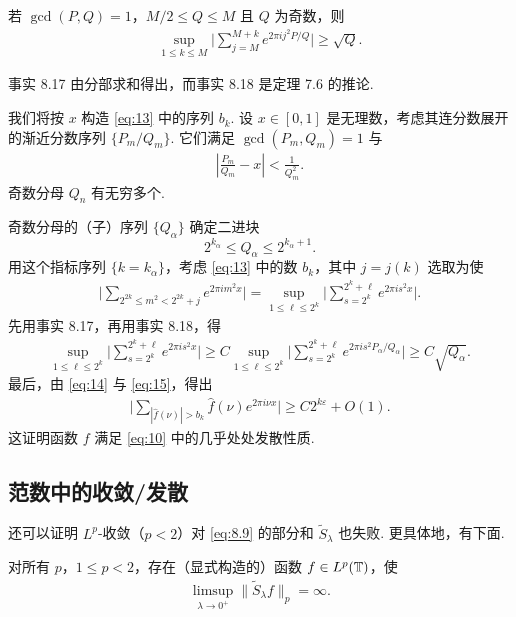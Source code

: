 \begin{fact}\label{fact:8.18}
若 $\gcd(P, Q) = 1$，$M/2 \leq Q \leq M$ 且 $Q$ 为奇数，则
\begin{align*}
  \sup_{1\leq k\leq M}\Big|\sum_{j=M}^{M+k}e^{2\pi i j^{2}P/Q}\Big|\geq\sqrt{Q}.
\end{align*}
\end{fact}

事实 8.17 由分部求和得出，而事实 8.18 是定理 7.6 的推论.

我们将按 $x$ 构造 \eqref{eq:13} 中的序列 $b_k$. 设 $x \in [0,1]$ 是无理数，考虑其连分数展开的渐近分数序列 $\{P_m/Q_m\}$. 它们满足 $\gcd(P_m, Q_m) = 1$ 与
\begin{align*}
  \left|\frac{P_{m}}{Q_{m}}-x\right|<\frac{1}{Q_{m}^{2}}.
\end{align*}
奇数分母 $Q_{n}$ 有无穷多个.

奇数分母的（子）序列 $\{Q_{\alpha}\}$ 确定二进块
\begin{equation}\label{eq:15}
  2^{k_{\alpha}}\leq Q_{\alpha}\leq 2^{k_{\alpha}+1}.
\end{equation}
用这个指标序列 $\{k = k_\alpha\}$，考虑 \eqref{eq:13} 中的数 $b_k$，其中 $j = j(k)$ 选取为使
\begin{align*}
  \Big|\sum_{2^{2k}\leq m^{2}<2^{2k}+j}e^{2\pi i m^{2}x}\Big|
  =\sup_{1\leq\ell\leq 2^{k}}\Big|\sum_{s=2^{k}}^{2^{k}+\ell}e^{2\pi i s^{2}x}\Big|.
\end{align*}
先用事实 8.17，再用事实 8.18，得
\begin{align*}
  \sup_{1\leq\ell\leq 2^{k}}\Big|\sum_{s=2^{k}}^{2^{k}+\ell}e^{2\pi i s^{2}x}\Big|
  \geq C\sup_{1\leq\ell\leq 2^{k}}\Big|\sum_{s=2^{k}}^{2^{k}+\ell}e^{2\pi i s^{2}P_{\alpha}/Q_{\alpha}}\Big|
  \geq C\sqrt{Q_{\alpha}}.
\end{align*}
最后，由 \eqref{eq:14} 与 \eqref{eq:15}，得出
\begin{align*}
  \Big|\sum_{|\widehat{f}(\nu)|>b_{k}}\widehat{f}(\nu)e^{2\pi i\nu x}\Big|
  \geq C2^{k\varepsilon}+O(1).
\end{align*}
这证明函数 $f$ 满足 \eqref{eq:10} 中的几乎处处发散性质.

\subsection{范数中的收敛/发散}

还可以证明 $L^p$-收敛（$p < 2$）对 \eqref{eq:8.9} 的部分和 $\tilde{S}_\lambda$ 也失败. 更具体地，有下面.

\begin{theorem}\label{thm:8.19}
对所有 $p$，$1 \leq p < 2$，存在（显式构造的）函数 $f \in L^p(\mathbb{T})$，使
\begin{align*}
  \limsup_{\lambda\to 0^{+}}\|\tilde{S}_{\lambda}f\|_{p}=\infty.
\end{align*}
\end{theorem}

